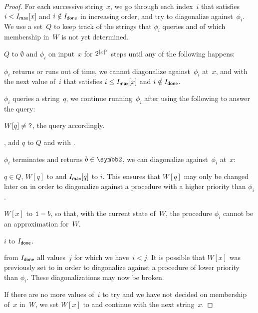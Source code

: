 \begin{proof}
  For each successive string~$x$, we go through each index~$i$ that satisfies $i < I_\textsf{max}[x]$ and $i \notin I_\textsf{done}$ in increasing order, and try to diagonalize against~$\phi_i$.
  We use a set~$Q$ to keep track of the strings that $\phi_i$ queries and of which membership in~$W$ is not yet determined.
  \begin{codelisting}
  \item
     $Q$ to $\emptyset$ and  $\phi_i$ on input~$x$ for $2^{\length{x}^2}$ steps until any of the following happens:
    \begin{codelisting}
    \item
       $\phi_i$ returns  or runs out of time, we cannot diagonalize against~$\phi_i$ at~$x$, and  with the next value of~$i$ that satisfies $i \le I_\code{max}[x]$ and $i \notin I_\code{done}$.
    \item
       $\phi_i$ queries a string~$q$, we continue running~$\phi_i$ after using the following to answer the query:
      \begin{codelisting}
      \item
         $W[q] \neq \bits{?}$,  the query accordingly.
      \item
        , add $q$ to $Q$ and  with .
      \end{codelisting}
    \item
       $\phi_i$ terminates and returns $b \in \binary$, we can diagonalize against~$\phi_i$ at~$x$:
      \begin{codelisting}
      \item
         $q \in Q$,  $W[q]$ to  and  $I_\code{max}[q]$ to $i$.
        This ensures that $W[q]$ may only be changed later on in order to diagonalize against a procedure with a higher priority than $\phi_i$.
      \item\label{code:nonreducible:diagonalize}%
         $W[x]$ to $\bits{1} - b$, so that, with the current state of~$W$, the procedure $\phi_i$ cannot be an approximation for~$W$.
      \item
         $i$ to $I_\code{done}$.
      \item
         from $I_\code{done}$ all values~$j$ for which we have~$i < j$.
        It is possible that $W[x]$ was previously set to  in order to diagonalize against a procedure of lower priority than $\phi_i$.
        These diagonalizations may now be broken.
      \end{codelisting}
    \end{codelisting}
  \end{codelisting}
  If there are no more values of~$i$ to try and we have not decided on membership of~$x$ in~$W$, we set $W[x]$ to  and continue with the next string~$x$.


\end{proof}
